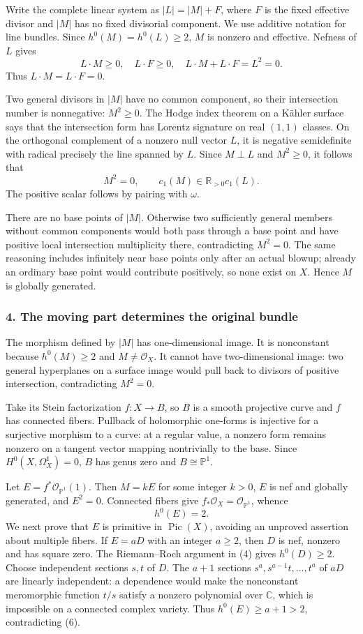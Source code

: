 \documentclass[11pt]{article}
\begin{document}
Write the complete linear system as $|L|=|M|+F$, where $F$ is the fixed effective divisor and $|M|$ has no fixed divisorial component. We use additive notation for line bundles. Since $h^0(M)=h^0(L)\ge2$, $M$ is nonzero and effective. Nefness of $L$ gives
\[
 L\cdot M\ge0,\quad L\cdot F\ge0,
 \quad L\cdot M+L\cdot F=L^2=0.
\]
Thus $L\cdot M=L\cdot F=0$.

Two general divisors in $|M|$ have no common component, so their intersection number is nonnegative: $M^2\ge0$. The Hodge index theorem on a K\"ahler surface says that the intersection form has Lorentz signature on real $(1,1)$ classes. On the orthogonal complement of a nonzero null vector $L$, it is negative semidefinite with radical precisely the line spanned by $L$. Since $M\perp L$ and $M^2\ge0$, it follows that
\[
 M^2=0,\qquad c_1(M)\in\mathbb R_{>0}c_1(L).           \tag{5}
\]
The positive scalar follows by pairing with $\omega$.

There are no base points of $|M|$. Otherwise two sufficiently general members without common components would both pass through a base point and have positive local intersection multiplicity there, contradicting $M^2=0$. The same reasoning includes infinitely near base points only after an actual blowup; already an ordinary base point would contribute positively, so none exist on $X$. Hence $M$ is globally generated.

\subsubsection{4. The moving part determines the original bundle}
The morphism defined by $|M|$ has one-dimensional image. It is nonconstant because $h^0(M)\ge2$ and $M\ne\mathcal O_X$. It cannot have two-dimensional image: two general hyperplanes on a surface image would pull back to divisors of positive intersection, contradicting $M^2=0$.

Take its Stein factorization $f:X\to B$, so $B$ is a smooth projective curve and $f$ has connected fibers. Pullback of holomorphic one-forms is injective for a surjective morphism to a curve: at a regular value, a nonzero form remains nonzero on a tangent vector mapping nontrivially to the base. Since $H^0(X,\Omega_X^1)=0$, $B$ has genus zero and $B\cong\mathbb P^1$.

Let $E=f^*\mathcal O_{\mathbb P^1}(1)$. Then $M=kE$ for some integer $k>0$, $E$ is nef and globally generated, and $E^2=0$. Connected fibers give $f_*\mathcal O_X=\mathcal O_{\mathbb P^1}$, whence
\[
 h^0(E)=2.                                            \tag{6}
\]
We next prove that $E$ is primitive in $\operatorname{Pic}(X)$, avoiding an unproved assertion about multiple fibers. If $E=aD$ with an integer $a\ge2$, then $D$ is nef, nonzero and has square zero. The Riemann--Roch argument in (4) gives $h^0(D)\ge2$. Choose independent sections $s,t$ of $D$. The $a+1$ sections
$s^a,s^{a-1}t,\ldots,t^a$ of $aD$ are linearly independent: a dependence would make the nonconstant meromorphic function $t/s$ satisfy a nonzero polynomial over $\mathbb C$, which is impossible on a connected complex variety. Thus $h^0(E)\ge a+1>2$, contradicting (6).
\end{document}
